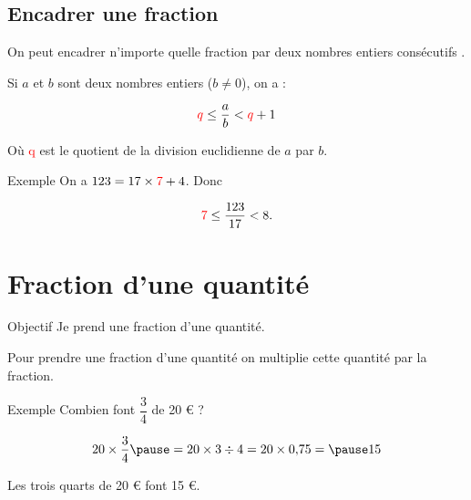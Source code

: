 \documentclass[xcolor={dvipsnames}]{beamer}
\begin{document}
\subsection{Encadrer une fraction}

\begin{frame}
	\begin{myprop}
		On peut encadrer n'importe quelle fraction par deux nombres entiers consécutifs . %
		
		Si $a$ et $b$ sont deux nombres entiers ($b \neq 0$), on a :
		
		\begin{equation*}
			\textcolor{red}{q} \leq \dfrac{a}{b} < \textcolor{red}{q}+1
		\end{equation*}
		
		Où \textcolor{red}{q} est le quotient de la division euclidienne de $a$ par $b$.
	\end{myprop}\pause

	\begin{exampleblock}{Exemple}
		On a $123 = 17 \times \textcolor{red}{7} + 4$. Donc 
		
		\begin{equation*}
			\textcolor{red}{7} \leq \dfrac{123}{17} < 8.
		\end{equation*}
	\end{exampleblock}
\end{frame}
\section{Fraction d'une quantité}

\begin{frame}
	\begin{block}{Objectif}
		Je prend une fraction d'une quantité.
	\end{block}
\end{frame}

\begin{frame}	
	\begin{myprop}
		Pour prendre une fraction d'une quantité on multiplie cette quantité par la fraction.
		
	\end{myprop} \pause

	\begin{exampleblock}{Exemple}
		Combien font $\dfrac{3}{4}$ de 20 € ? \pause
		
		\begin{equation*}
			20 \times \dfrac{3}{4} \pause = 20 \times 3 \div 4 =  20 \times \num{0.75} = \pause 15 
		\end{equation*}\pause
		
		Les trois quarts de 20 € font 15 €.
	\end{exampleblock}

\end{frame}
\end{document}
